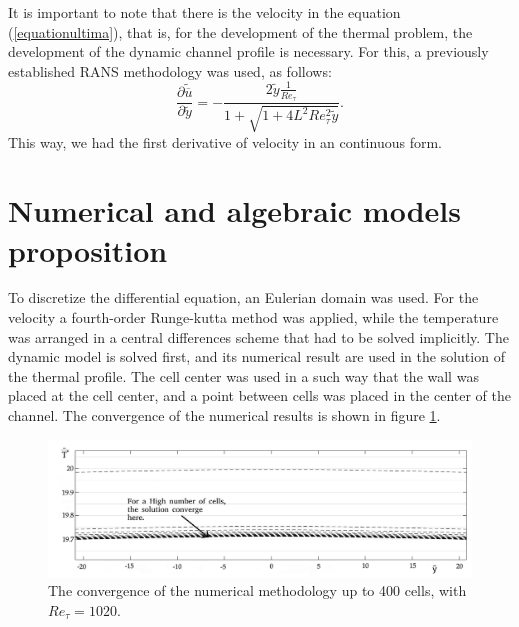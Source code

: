 \documentclass[10pt]{article} %
\begin{document}
It is important to note that there is the velocity in the equation (\ref{equationultima}), that is, for the development of the thermal problem, the development of the dynamic channel profile is necessary. For this, a previously established RANS methodology \cite{Luigi} was used, as follows:
\begin{equation}\label{finalequationvelocity}	
\frac{\partial \tilde{\overline{u}}}{\partial \tilde{y}} = - \frac{2 \tilde{y} \frac{1}{Re_\tau} }{ 1 + \sqrt{ 1 + 4 L ^2 Re_\tau ^2 \tilde{y}}}.
\end{equation}	
This way, we had the first derivative of velocity in an continuous form.


\section{Numerical and algebraic models proposition}


To discretize the differential equation, an Eulerian domain was used. For the velocity a fourth-order Runge-kutta method was applied, while the temperature was arranged in a central differences scheme that had to be solved implicitly. The dynamic model is solved first, and its numerical result are used in the solution of the thermal profile. The cell center was used in a such way that the wall was placed at the cell center, and a point between cells was placed in the center of the channel. The convergence of the numerical results is shown in figure \ref{sistema}.
\begin{figure}[!h]
	\centering
	\includegraphics[angle=0, trim={10mm 0mm 0mm 0mm}, clip , scale=0.32]{convergnciaprimeira}
	\caption{The convergence of the numerical methodology up to 400 cells, with $Re_\tau = 1020$.}
	\label{sistema}
\end{figure}
\end{document}

